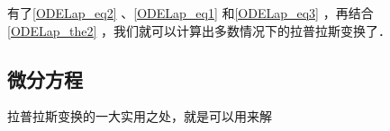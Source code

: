 有了\autoref{ODELap_eq2} 、\autoref{ODELap_eq1} 和\autoref{ODELap_eq3} ，再结合\autoref{ODELap_the2} ，我们就可以计算出多数情况下的拉普拉斯变换了．



\subsection{微分方程}

拉普拉斯变换的一大实用之处，就是可以用来解\te


















